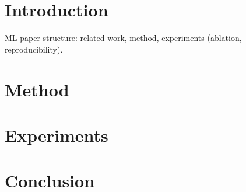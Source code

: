 \documentclass{article}
\begin{document}

\begin{abstract}
This is the abstract.
\end{abstract}

\section{Introduction}
ML paper structure: related work, method, experiments (ablation, reproducibility).

\section{Method}

\section{Experiments}

\section{Conclusion}



\end{document}
